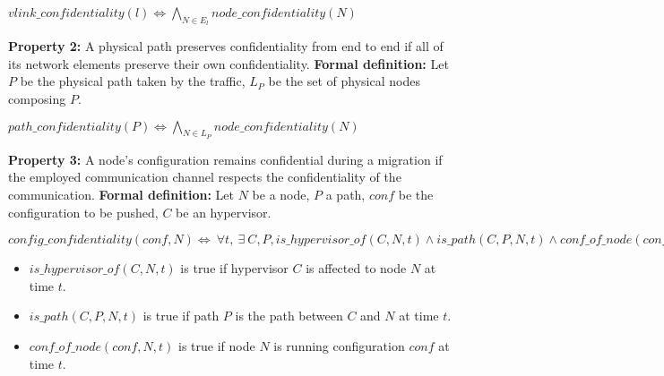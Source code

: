 \begin{myformula}
$vlink\_confidentiality(l) \Leftrightarrow \bigwedge\limits_{N\in E_l} node\_confidentiality(N) $
\end{myformula}

\textbf{Property 2:} A physical path preserves confidentiality from end to end if all of its network elements preserve their own confidentiality.
\newline \textbf{Formal definition:} Let $P$ be the physical path taken by the traffic, $L_P$ be the set of physical nodes composing $P$.

\begin{myformula}
$path\_confidentiality(P) \Leftrightarrow \bigwedge\limits_{N \in L_P}node\_confidentiality(N)$
\end{myformula}


\textbf{Property 3:} A node's configuration remains confidential during a migration if the employed communication channel respects the confidentiality of the communication.
\newline \textbf{Formal definition:} Let $N$ be a node, $P$ a path, $conf$ be the configuration to be pushed, $C$ be an hypervisor.
\newline

\begin{myformula}
$config\_confidentiality(conf,N) \Leftrightarrow~\forall t,~\exists~C,P, 
is\_hypervisor\_of(C,N,t) \wedge is\_path(C,P,N,t) \wedge  conf\_of\_node(conf,N,t) \Rightarrow
~path\_confidentiality(P) \wedge  node\_confidentiality(N)
$
\end{myformula}


\begin{itemize}
\item $is\_hypervisor\_of(C,N,t)$ is true if hypervisor $C$ is affected to node $N$ at time $t$. 
\item $is\_path(C,P,N,t)$ is true if path $P$ is the path between $C$ and $N$ at time $t$.
\item $conf\_of\_node(conf,N,t)$ is true if node $N$ is running configuration $conf$ at time $t$.
\end{itemize}


